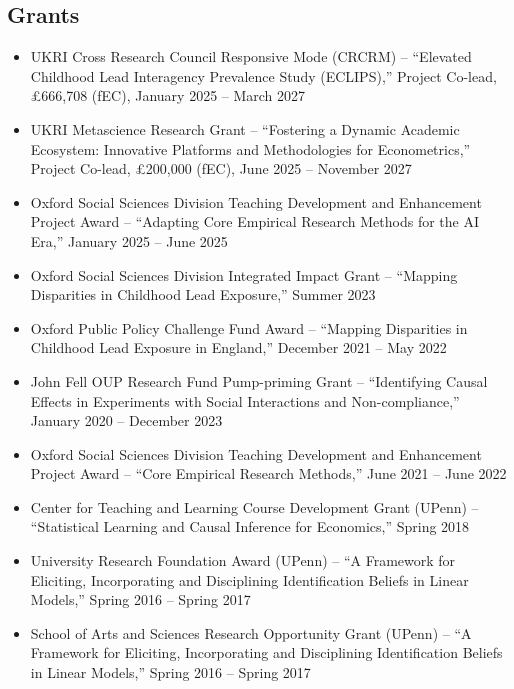 \documentclass[line,overlapped]{myres}
\begin{document}
\begin{resume}
\section{\sc Grants}
\begin{itemize}
  \item UKRI Cross Research Council Responsive Mode (CRCRM) -- ``Elevated Childhood Lead Interagency Prevalence Study (ECLIPS),'' Project Co-lead, £666,708 (fEC), January 2025 -- March 2027
  \item UKRI Metascience Research Grant -- ``Fostering a Dynamic Academic Ecosystem: Innovative Platforms and Methodologies for Econometrics,'' Project Co-lead, £200,000 (fEC), June 2025 -- November 2027
  \item Oxford Social Sciences Division Teaching Development and Enhancement Project Award -- ``Adapting Core Empirical Research Methods for the AI Era,'' January 2025 -- June 2025 %
  \item Oxford Social Sciences Division Integrated Impact Grant -- ``Mapping Disparities in Childhood Lead Exposure,'' Summer 2023 %
  \item Oxford Public Policy Challenge Fund Award -- ``Mapping Disparities in Childhood Lead Exposure in England,'' December 2021 -- May 2022 %
  \item John Fell OUP Research Fund Pump-priming Grant -- ``Identifying Causal Effects in Experiments with Social Interactions and Non-compliance,'' January 2020 -- December 2023 %
  \item Oxford Social Sciences Division Teaching Development and Enhancement Project Award -- ``Core Empirical Research Methods,'' June 2021 -- June 2022 %
  \item Center for Teaching and Learning Course Development Grant (UPenn) -- ``Statistical Learning and Causal Inference for Economics,'' Spring 2018 %
  \item University Research Foundation Award (UPenn) -- ``A Framework for Eliciting, Incorporating and Disciplining Identification Beliefs in Linear Models,'' Spring 2016 -- Spring 2017 %
  \item School of Arts and Sciences Research Opportunity Grant (UPenn) -- ``A Framework for Eliciting, Incorporating and Disciplining Identification Beliefs in Linear Models,'' Spring 2016 -- Spring 2017  %
\end{itemize}



\end{resume}
\end{document}
